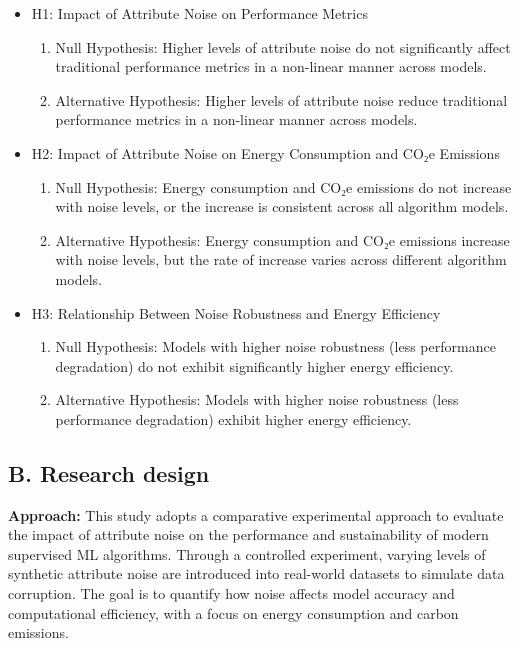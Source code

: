 \documentclass[conference]{IEEEtran}
\begin{document}
\begin{itemize}[noitemsep, leftmargin=*]

    \item H1: Impact of Attribute Noise on Performance Metrics
    \begin{enumerate}
        \item Null Hypothesis: Higher levels of attribute noise do not significantly affect traditional performance metrics in a non-linear manner across models.
        \item Alternative Hypothesis: Higher levels of attribute noise reduce traditional performance metrics in a non-linear manner across models.
    \end{enumerate}

    \item H2: Impact of Attribute Noise on Energy Consumption and CO₂e Emissions
    \begin{enumerate}
        \item Null Hypothesis: Energy consumption and CO₂e emissions do not increase with noise levels, or the increase is consistent across all algorithm models.
        \item Alternative Hypothesis: Energy consumption and CO₂e emissions increase with noise levels, but the rate of increase varies across different algorithm models.
    \end{enumerate}

    \item H3: Relationship Between Noise Robustness and Energy Efficiency
    \begin{enumerate}
        \item Null Hypothesis: Models with higher noise robustness (less performance degradation) do not exhibit significantly higher energy efficiency.
        \item Alternative Hypothesis: Models with higher noise robustness (less performance degradation) exhibit higher energy efficiency.
    \end{enumerate}

\end{itemize}


\subsection*{B. Research design}

\textbf{Approach:} This study adopts a comparative experimental approach to evaluate the impact of attribute noise on the performance and sustainability of modern supervised ML algorithms. Through a controlled experiment, varying levels of synthetic attribute noise are introduced into real-world datasets to simulate data corruption. The goal is to quantify how noise affects model accuracy and computational efficiency, with a focus on energy consumption and carbon emissions.
\newline
\end{document}
